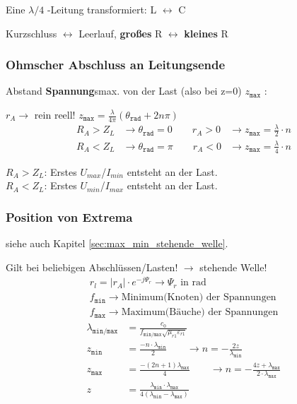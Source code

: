 Eine $ \lambda / 4 $ -Leitung transformiert: L $ \leftrightarrow $ C

Kurzschluss $ \leftrightarrow $ Leerlauf, \textbf{großes} R $ \leftrightarrow$
\textbf{kleines} R

\subsubsection{Ohmscher Abschluss an Leitungsende}
Abstand \textbf{Spannung}smax. von der Last (also bei z=0) $ z_{\texttt{max}} $ :

$ r_A \rightarrow$ rein reell! \qquad $ z_{\texttt{max}} = \frac{\lambda}{4\pi}
	(\theta_{\texttt{rad}}+2n\pi)$
\begin{align*}
	R_A > Z_L & \rightarrow\theta_{\texttt{rad}} = 0 \qquad r_A >0
	          & \rightarrow z_\texttt{max}=\frac{\lambda}{2}\cdot n  \\
	R_A < Z_L & \rightarrow\theta_{\texttt{rad}} = \pi \qquad r_A <0
	          & \rightarrow z_\texttt{max}=\frac{\lambda}{4}\cdot n
\end{align*}

$ R_A > Z_L $: Erstes $ U_{max}$/$ I_{min} $ entsteht an der Last.\\
$ R_A < Z_L $: Erstes $ U_{min}$/$ I_{max} $ entsteht an der Last.

\subsubsection{Position von Extrema}
siehe auch Kapitel \ref{sec:max_min_stehende_welle}.

Gilt bei beliebigen Abschlüssen/Lasten! $ \rightarrow $ stehende Welle!
\begin{gather*}
	\boxed{r_{l} = |r_A|\cdot e^{-j\Psi_r}}\rightarrow\Psi_r\text{ in rad}\\
	f_\texttt{min}\rightarrow \text{Minimum(Knoten) der Spannungen}\\
	f_\texttt{max}\rightarrow \text{Maximum(Bäuche) der Spannungen}
\end{gather*}
\begin{align*}
	\lambda_\texttt{min/max} & = \frac{c_0}{f_\texttt{min/max}\sqrt{\mu_{r1}\varepsilon_{r1}}}                                                                                                 \\
	z_\texttt{min}           & =\frac{-n\cdot\lambda_\texttt{min}}{2}                                        \qquad\rightarrow n = -\frac{2z}{\lambda_\texttt{min}}                            \\
	z_\texttt{max}           & =\frac{-(2n+1)\lambda_\texttt{max}}{4}                                        \qquad\rightarrow n = -\frac{4z+\lambda_\texttt{max}}{2\cdot\lambda_\texttt{max}} \\
	z                        & = \frac{\lambda_\texttt{min}\cdot\lambda_\texttt{max}}{4(\lambda_\texttt{min}-\lambda_\texttt{max})}
\end{align*}

